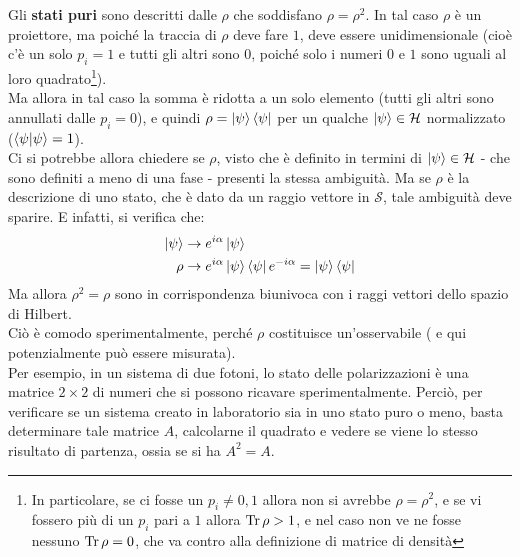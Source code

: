 \documentclass[../../FisicaTeorica.tex]{subfiles}
\begin{document}
Gli \textbf{stati puri} sono descritti dalle $\rho$ che soddisfano $\rho =\rho^2$. In tal caso $\rho$  è un proiettore, ma poiché la traccia di $\rho$ deve fare $1$, deve essere unidimensionale (cioè c'è un solo $p_i=1$ e tutti gli altri sono $0$, poiché solo i numeri $0$ e $1$ sono uguali al loro quadrato\footnote{In particolare, se ci fosse un $p_i \neq 0,1$ allora non si avrebbe $\rho = \rho^2$, e se vi fossero più di un $p_i$ pari a $1$ allora $\operatorname{Tr}\rho > 1$, e nel caso non ve ne fosse nessuno $\operatorname{Tr}\rho = 0$, che va contro alla definizione di matrice di densità}).\\
Ma allora in tal caso la somma è ridotta a un solo elemento (tutti gli altri sono annullati dalle $p_i = 0$), e quindi $\rho =\ket{\psi}\bra{\psi}$ per un qualche $\ket{\psi}\in \mathcal{H}$ normalizzato  ($\braket{\psi|\psi}=1$).\\
Ci si potrebbe allora chiedere se $\rho$, visto che è definito in termini di $\ket{\psi}\in \mathcal{H}$ - che sono definiti a meno di una fase - presenti la stessa ambiguità. Ma se $\rho$ è la descrizione di uno stato, che è dato da un raggio vettore in $\mathcal{S}$, tale ambiguità deve sparire. E infatti, si verifica che:
\begin{align*}
    \ket{\psi}&\rightarrow e^{i\alpha}\ket{\psi}\\
\rho &\rightarrow e^{i\alpha}\ket{\psi}\bra{\psi}e^{-i\alpha}=\ket{\psi}\bra{\psi}
\end{align*}
Ma allora $\rho^2=\rho$ sono in corrispondenza biunivoca con i raggi vettori dello spazio di Hilbert.\\
Ciò è comodo sperimentalmente, perché $\rho$ costituisce un'osservabile ( e qui potenzialmente può essere misurata).\\
Per esempio, in un sistema di due fotoni, lo stato delle polarizzazioni è una matrice $2\times 2$ di numeri che si possono ricavare sperimentalmente. Perciò, per verificare se un sistema creato in laboratorio sia in uno stato puro o meno, basta determinare tale matrice $A$, calcolarne il quadrato e vedere se viene lo stesso risultato di partenza, ossia se si ha $A^2 = A$.\\
\end{document}
